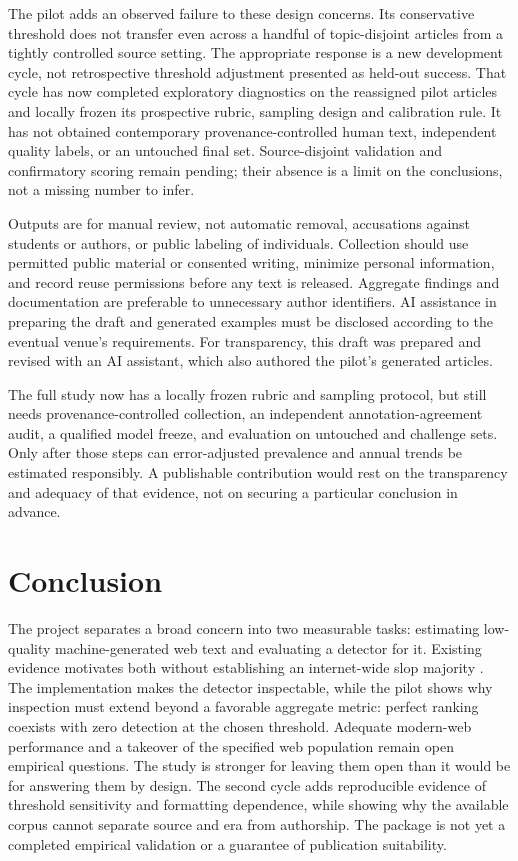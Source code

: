 \documentclass[11pt]{article}
\begin{document}
The pilot adds an observed failure to these design concerns. Its conservative
threshold does not transfer even across a handful of topic-disjoint articles
from a tightly controlled source setting. The appropriate response is a
new development cycle, not retrospective threshold adjustment presented as
held-out success. That cycle has now completed exploratory diagnostics on
the reassigned pilot articles and locally frozen its prospective rubric,
sampling design and calibration rule. It has not obtained contemporary
provenance-controlled human text, independent quality labels, or an untouched
final set. Source-disjoint validation and confirmatory scoring remain pending;
their absence is a limit on the conclusions, not a missing number to infer.

Outputs are for manual review, not automatic removal, accusations against
students or authors, or public labeling of individuals. Collection should
use permitted public material or consented writing, minimize personal
information, and record reuse permissions before any text is released.
Aggregate findings and documentation are preferable to unnecessary author
identifiers. AI assistance in preparing the draft and generated examples
must be disclosed according to the eventual venue's requirements. For
transparency, this draft was prepared and revised with an AI assistant, which
also authored the pilot's generated articles.

The full study now has a locally frozen rubric and sampling protocol, but
still needs provenance-controlled collection, an independent annotation-agreement
audit, a qualified model freeze, and evaluation on untouched and challenge sets.
Only after those steps can error-adjusted
prevalence and annual trends be estimated responsibly. A publishable
contribution would rest on the transparency and adequacy of that evidence,
not on securing a particular conclusion in advance.

\section{Conclusion}
The project separates a broad concern into two measurable tasks: estimating
low-quality machine-generated web text and evaluating a detector for it.
Existing evidence motivates both without establishing an internet-wide slop
majority \cite{pew,pewmethods,dolezal}. The implementation makes the detector
inspectable, while the pilot shows why inspection must extend beyond a
favorable aggregate metric: perfect ranking coexists with zero detection at
the chosen threshold. Adequate modern-web performance and a takeover of the
specified web population remain open empirical questions. The study is
stronger for leaving them open than it would be for answering them by design.
The second cycle adds reproducible evidence of threshold sensitivity and
formatting dependence, while showing why the available corpus cannot separate
source and era from authorship. The package is not yet a completed empirical
validation or a guarantee of publication suitability.
\end{document}
